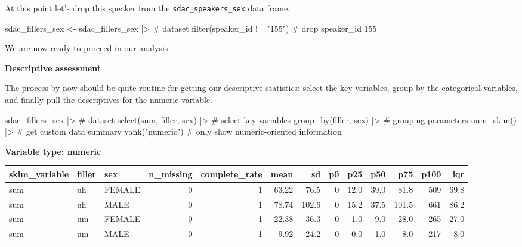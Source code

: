 \documentclass[
  letterpaper,
]{latex/krantz}
\newenvironment{Shaded}{\begin{snugshade}}{\end{snugshade}}
\newcommand{\CommentTok}[1]{\textcolor[rgb]{0.37,0.37,0.37}{#1}}
\newcommand{\FunctionTok}[1]{\textcolor[rgb]{0.28,0.35,0.67}{#1}}
\newcommand{\NormalTok}[1]{\textcolor[rgb]{0.00,0.23,0.31}{#1}}
\newcommand{\OtherTok}[1]{\textcolor[rgb]{0.00,0.23,0.31}{#1}}
\newcommand{\SpecialCharTok}[1]{\textcolor[rgb]{0.37,0.37,0.37}{#1}}
\newcommand{\StringTok}[1]{\textcolor[rgb]{0.13,0.47,0.30}{#1}}
\begin{document}
At this point let's drop this speaker from the
\texttt{sdac\_speakers\_sex} data frame.

\begin{Shaded}
\begin{Highlighting}[]
\NormalTok{sdac\_fillers\_sex }\OtherTok{\textless{}{-}} 
\NormalTok{  sdac\_fillers\_sex }\SpecialCharTok{|\textgreater{}} \CommentTok{\# dataset}
  \FunctionTok{filter}\NormalTok{(speaker\_id }\SpecialCharTok{!=} \StringTok{"155"}\NormalTok{) }\CommentTok{\# drop speaker\_id 155}
\end{Highlighting}
\end{Shaded}

We are now ready to proceed in our analysis.

\textbf{Descriptive assessment}

The process by now should be quite routine for getting our descriptive
statistics: select the key variables, group by the categorical
variables, and finally pull the descriptives for the numeric variable.

\begin{Shaded}
\begin{Highlighting}[]
\NormalTok{sdac\_fillers\_sex }\SpecialCharTok{|\textgreater{}} \CommentTok{\# dataset}
  \FunctionTok{select}\NormalTok{(sum, filler, sex) }\SpecialCharTok{|\textgreater{}} \CommentTok{\# select key variables}
  \FunctionTok{group\_by}\NormalTok{(filler, sex) }\SpecialCharTok{|\textgreater{}} \CommentTok{\# grouping parameters}
  \FunctionTok{num\_skim}\NormalTok{() }\SpecialCharTok{|\textgreater{}} \CommentTok{\# get custom data summary}
  \FunctionTok{yank}\NormalTok{(}\StringTok{"numeric"}\NormalTok{) }\CommentTok{\# only show numeric{-}oriented information}
\end{Highlighting}
\end{Shaded}

\textbf{Variable type: numeric}

\begin{tabular}{l|l|l|r|r|r|r|r|r|r|r|r|r}
\hline
skim\_variable & filler & sex & n\_missing & complete\_rate & mean & sd & p0 & p25 & p50 & p75 & p100 & iqr\\
\hline
sum & uh & FEMALE & 0 & 1 & 63.22 & 76.5 & 0 & 12.0 & 39.0 & 81.8 & 509 & 69.8\\
\hline
sum & uh & MALE & 0 & 1 & 78.74 & 102.6 & 0 & 15.2 & 37.5 & 101.5 & 661 & 86.2\\
\hline
sum & um & FEMALE & 0 & 1 & 22.38 & 36.3 & 0 & 1.0 & 9.0 & 28.0 & 265 & 27.0\\
\hline
sum & um & MALE & 0 & 1 & 9.92 & 24.2 & 0 & 0.0 & 1.0 & 8.0 & 217 & 8.0\\
\hline
\end{tabular}
\end{document}
